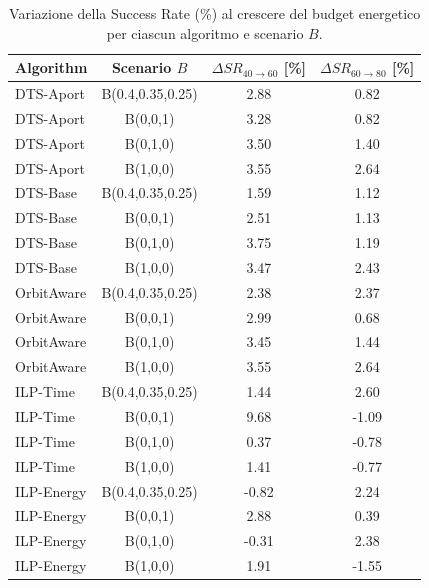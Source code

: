 \documentclass[12pt]{article}
\begin{document}
\begin{table}[h]
\centering
\begin{tabular}{lccc}
\hline
Algorithm & Scenario $B$ & $\Delta SR_{40 \rightarrow 60}$ [\%] & $\Delta SR_{60 \rightarrow 80}$ [\%] \\
\hline

DTS-Aport & B(0.4,0.35,0.25) & 2.88 & 0.82 \\
DTS-Aport & B(0,0,1)         & 3.28 & 0.82 \\
DTS-Aport & B(0,1,0)         & 3.50 & 1.40 \\
DTS-Aport & B(1,0,0)         & 3.55 & 2.64 \\
\hline
DTS-Base & B(0.4,0.35,0.25) & 1.59 & 1.12 \\
DTS-Base & B(0,0,1)         & 2.51 & 1.13 \\
DTS-Base & B(0,1,0)         & 3.75 & 1.19 \\
DTS-Base & B(1,0,0)         & 3.47 & 2.43 \\
\hline
OrbitAware & B(0.4,0.35,0.25) & 2.38 & 2.37 \\
OrbitAware & B(0,0,1)         & 2.99 & 0.68 \\
OrbitAware & B(0,1,0)         & 3.45 & 1.44 \\
OrbitAware & B(1,0,0)         & 3.55 & 2.64 \\
\hline
ILP-Time & B(0.4,0.35,0.25) & 1.44 & 2.60 \\
ILP-Time & B(0,0,1)         & 9.68 & -1.09 \\
ILP-Time & B(0,1,0)         & 0.37 & -0.78 \\
ILP-Time & B(1,0,0)         & 1.41 & -0.77 \\
\hline
ILP-Energy & B(0.4,0.35,0.25) & -0.82 & 2.24 \\
ILP-Energy & B(0,0,1)         & 2.88 & 0.39 \\
ILP-Energy & B(0,1,0)         & -0.31 & 2.38 \\
ILP-Energy & B(1,0,0)         & 1.91 & -1.55 \\

\hline
\end{tabular}
\caption{Variazione della Success Rate (\%) al crescere del budget energetico per ciascun algoritmo e scenario $B$.}
\label{tab:sr_variation_energy_all}
\end{table}
\FloatBarrier
\end{document}
